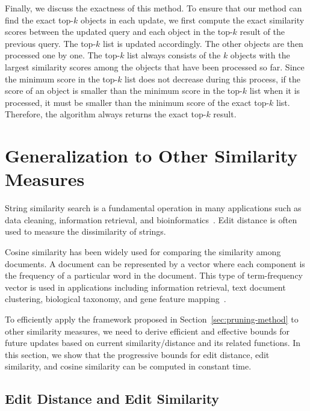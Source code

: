 Finally, we discuss the exactness of this method. To ensure that our method can find the exact top-$k$ objects in each update, we first compute the exact similarity scores between the updated query and each object in the top-$k$ result of the previous query. The top-$k$ list is updated accordingly. The other objects are then processed one by one. The top-$k$ list always consists of the $k$ objects with the largest similarity scores among the objects that have been processed so far. Since the minimum score in the top-$k$ list does not decrease during this process, if the score of an object is smaller than the minimum score in the top-$k$ list when it is processed, it must be smaller than the minimum score of the exact top-$k$ list. Therefore, the algorithm always returns the exact top-$k$ result. 

\section{Generalization to Other Similarity Measures}
\label{sec:gen-sim}
String similarity search is a fundamental operation in many applications such as data cleaning, information retrieval, and bioinformatics~\cite{DLFL13}. Edit distance is often used to measure the dissimilarity of strings.

Cosine similarity has been widely used for comparing the similarity among documents. A document can be represented by a vector where each component is the frequency of a particular word in the document. This type of term-frequency vector is used in applications including information retrieval, text document clustering, biological taxonomy, and gene feature mapping~\cite{HkP11}.        

To efficiently apply the framework proposed in Section~\ref{sec:pruning-method} to other similarity measures, we need to derive efficient and effective bounds for future updates based on current similarity/distance and its related functions. In this section, we show that the progressive bounds for edit distance, edit similarity, and cosine similarity can be computed in constant time.    

 
\subsection{Edit Distance and Edit Similarity}

